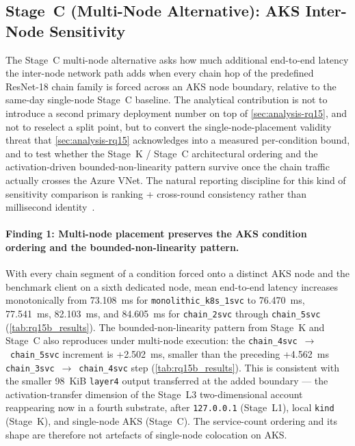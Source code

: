 \subsection{Stage~C (Multi-Node Alternative): AKS Inter-Node Sensitivity}
\label{sec:analysis-rq15b}

The Stage~C multi-node alternative asks how much additional end-to-end latency the inter-node network path
adds when every chain hop of the predefined ResNet-18 chain family is forced
across an AKS node boundary, relative to the same-day single-node Stage~C
baseline. The analytical contribution is not to introduce a second primary
deployment number on top of \cref{sec:analysis-rq15}, and not to reselect a
split point, but to convert the single-node-placement validity threat that
\cref{sec:analysis-rq15} acknowledges into a measured per-condition bound, and
to test whether the Stage~K / Stage~C architectural ordering and the
activation-driven bounded-non-linearity pattern survive once the chain
traffic actually crosses the Azure VNet. The natural reporting discipline
for this kind of sensitivity comparison is ranking + cross-round consistency
rather than millisecond identity~\cite{benchmarking_sc15}.

\paragraph{Finding 1: Multi-node placement preserves the AKS condition ordering and the bounded-non-linearity pattern.}
With every chain segment of a condition forced onto a distinct AKS node and
the benchmark client on a sixth dedicated node, mean end-to-end latency
increases monotonically from 73.108~ms for
\texttt{monolithic\_k8s\_1svc} to 76.470~ms, 77.541~ms, 82.103~ms, and
84.605~ms for \texttt{chain\_2svc} through \texttt{chain\_5svc}
(\cref{tab:rq15b_results}). The bounded-non-linearity pattern from Stage~K and
Stage~C also reproduces under multi-node execution: the
\texttt{chain\_4svc}~$\rightarrow$~\texttt{chain\_5svc} increment is
+2.502~ms, smaller than the preceding +4.562~ms
\texttt{chain\_3svc}~$\rightarrow$~\texttt{chain\_4svc} step
(\cref{tab:rq15b_results}). This is consistent with the smaller 98~KiB
\texttt{layer4} output transferred at the added boundary --- the
activation-transfer dimension of the Stage~L3 two-dimensional
account~\cite{deeperthings} reappearing now in a fourth substrate, after
\texttt{127.0.0.1} (Stage~L1), local \texttt{kind} (Stage~K), and single-node AKS
(Stage~C). The service-count ordering and its shape are therefore not
artefacts of single-node colocation on AKS.

